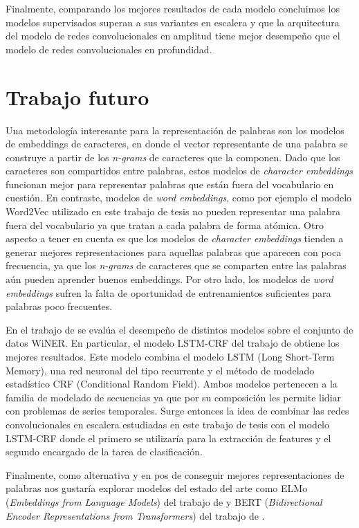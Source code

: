Finalmente, comparando los mejores resultados de cada modelo concluimos los modelos supervisados superan a sus variantes en escalera y que la arquitectura del modelo de redes convolucionales en amplitud tiene mejor desempeño que el modelo de redes convolucionales en profundidad.

\section{Trabajo futuro}

Una metodología interesante para la representación de palabras son los modelos de embeddings de caracteres, en donde el vector representante de una palabra se construye a partir de los \textit{n-grams} de caracteres que la componen. Dado que los caracteres son compartidos entre palabras, estos modelos de \textit{character embeddings} funcionan mejor para representar palabras que están fuera del vocabulario en cuestión. En contraste, modelos de \textit{word embeddings}, como por ejemplo el modelo Word2Vec utilizado en este trabajo de tesis no pueden representar una palabra fuera del vocabulario ya que tratan a cada palabra de forma atómica. Otro aspecto a tener en cuenta es que los modelos de \textit{character embeddings} tienden a generar mejores representaciones para aquellas palabras que aparecen con poca frecuencia, ya que los \textit{n-grams} de caracteres que se comparten entre las palabras aún pueden aprender buenos embeddings. Por otro lado, los modelos de \textit{word embeddings} sufren la falta de oportunidad de entrenamientos suficientes para palabras poco frecuentes.

En el trabajo de \cite{WiNER-Ghaddar-Langlais} se evalúa el desempeño de distintos modelos sobre el conjunto de datos WiNER. En particular, el modelo LSTM-CRF del trabajo de \cite{DBLP:journals/corr/HuangXY15} obtiene los mejores resultados. Este modelo combina el modelo LSTM (Long Short-Term Memory), una red neuronal del tipo recurrente y el método de modelado estadístico CRF (Conditional Random Field). Ambos modelos pertenecen a la familia de modelado de secuencias ya que por su composición les permite lidiar con problemas de series temporales. Surge entonces la idea de combinar las redes convolucionales en escalera estudiadas en este trabajo de tesis con el modelo LSTM-CRF donde el primero se utilizaría para la extracción de features y el segundo encargado de la tarea de clasificación.

Finalmente, como alternativa y en pos de conseguir mejores representaciones de palabras nos gustaría explorar modelos del estado del arte como ELMo (\textit{Embeddings from Language Models}) del trabajo de \cite{DBLP:journals/corr/abs-1802-05365} y BERT (\textit{Bidirectional Encoder Representations from Transformers}) del trabajo de \cite{DBLP:journals/corr/abs-1810-04805}.
